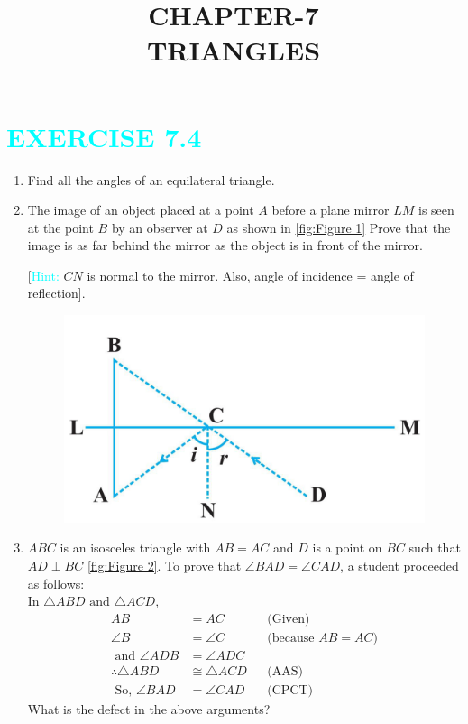 \documentclass {article}
\title{CHAPTER-7\\TRIANGLES}
\date{}
\begin{document}

\maketitle
\section*{\textcolor{cyan}{ EXERCISE 7.4}}	
\begin {enumerate}
\item Find all the angles of an equilateral triangle.
\item The image of an object placed at a point $A$ before a plane mirror $LM$ is seen at the point $B$ by an observer at $D$ as shown in \eqref{fig:Figure 1} Prove that the image is as far behind the mirror as the object is in front  of the mirror.

[\textcolor{cyan}{Hint:} $CN$ is normal to the mirror. Also, angle of incidence = angle of reflection].
\begin{figure}[!h]
\centering
 \includegraphics[width=\columnwidth]{./figs/7A.png}
\caption{}
\label{fig:Figure 1}
\end{figure}
\item $ABC$ is an isosceles triangle with $AB = AC$ and $D$ is a point on $BC$ such that $AD\perp  BC$ \eqref{fig:Figure 2}. To prove that $\angle BAD = \angle CAD$, a student proceeded as follows:\\
In $\triangle  ABD \text{ and }\triangle  ACD$,
\begin{align}
AB &= AC &&\text{(Given)}\\
\angle B &= \angle C &&\text{(because $AB = AC$)}\\
\text{ and }
\angle ADB &= \angle ADC\\
\therefore \triangle  ABD &\cong  \triangle ACD &&\text {(AAS)} \\
\text { So, }  \angle BAD &= \angle CAD &&\text{(CPCT)}
\end{align}
What is the defect in the above arguments?


\end{enumerate}
\end{document}
